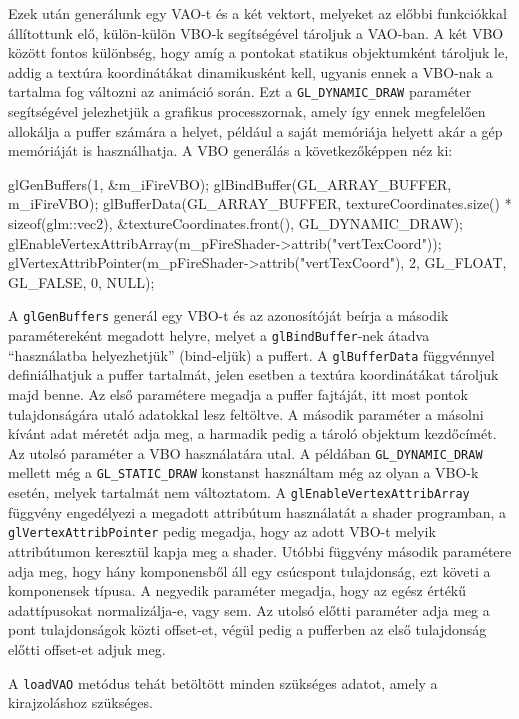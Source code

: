 Ezek után generálunk egy VAO-t és a két vektort, melyeket az előbbi funkciókkal állítottunk elő, külön-külön VBO-k segítségével tároljuk a VAO-ban. A két VBO között fontos különbség, hogy amíg a pontokat statikus objektumként tároljuk le, addig a textúra koordinátákat dinamikusként kell, ugyanis ennek a VBO-nak a tartalma fog változni az animáció során. Ezt a \texttt{GL\_DYNAMIC\_DRAW} paraméter segítségével jelezhetjük a grafikus processzornak, amely így ennek megfelelően allokálja a puffer számára a helyet, például a saját memóriája helyett akár a gép memóriáját is használhatja.
A VBO generálás a következőképpen néz ki:
\begin{cpp}
glGenBuffers(1, &m_iFireVBO);
glBindBuffer(GL_ARRAY_BUFFER, m_iFireVBO);
glBufferData(GL_ARRAY_BUFFER, 
	textureCoordinates.size() * sizeof(glm::vec2), 
	&textureCoordinates.front(), GL_DYNAMIC_DRAW);
glEnableVertexAttribArray(m_pFireShader->attrib("vertTexCoord"));
glVertexAttribPointer(m_pFireShader->attrib("vertTexCoord"), 2, 
	GL_FLOAT, GL_FALSE, 0, NULL);
\end{cpp}
A \texttt{glGenBuffers} generál egy VBO-t és az azonosítóját beírja a második paramétereként megadott helyre, melyet a \texttt{glBindBuffer}-nek átadva ``használatba helyezhetjük'' (bind-eljük) a puffert. A \texttt{glBufferData} függvénnyel definiálhatjuk a puffer tartalmát, jelen esetben a textúra koordinátákat tároljuk majd benne. Az első paramétere megadja a puffer fajtáját, itt most pontok tulajdonságára utaló adatokkal lesz feltöltve. A második paraméter a másolni kívánt adat méretét adja meg, a harmadik pedig a tároló objektum kezdőcímét. Az utolsó paraméter a VBO használatára utal. A példában \texttt{GL\_DYNAMIC\_DRAW} mellett még a \texttt{GL\_STATIC\_DRAW} konstanst használtam még az olyan a VBO-k esetén, melyek tartalmát nem változtatom. A \texttt{glEnableVertexAttribArray} függvény engedélyezi a megadott attribútum használatát a shader programban, a \texttt{glVertexAttribPointer} pedig megadja, hogy az adott VBO-t melyik attribútumon keresztül kapja meg a shader. Utóbbi függvény második paramétere adja meg, hogy hány komponensből áll egy csúcspont tulajdonság, ezt követi a komponensek típusa. A negyedik paraméter megadja, hogy az egész értékű adattípusokat normalizálja-e, vagy sem. Az utolsó előtti paraméter adja meg a pont tulajdonságok közti offset-et, végül pedig a pufferben az első tulajdonság előtti offset-et adjuk meg.

A \texttt{loadVAO} metódus tehát betöltött minden szükséges adatot, amely a kirajzoláshoz szükséges.

